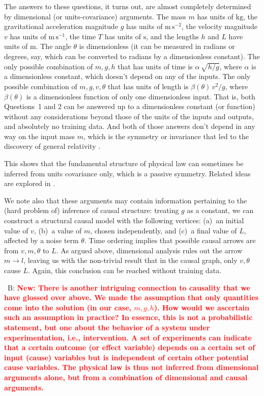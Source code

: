 \documentclass{article}
\newcommand{\unit}[1]{\mathrm{#1}}
\newcommand{\kg}{\unit{kg}}
\newcommand{\m}{\unit{m}}
\newcommand{\s}{\unit{s}}
\newcommand{\bernhard}[1]{~B: \textcolor{red}{\textbf{#1}}}
\begin{document}
The answers to these questions, it turns out, are almost completely determined by dimensional (or units-covariance) arguments.
The mass $m$ has units of $\kg$, the gravitational acceleration magnitude $g$ has units of $\m\,\s^{-2}$, the velocity magnitude $v$ has units of $\m\,\s^{-1}$, the time $T$ has units of $\s$, and the lengths $h$ and $L$ have units of $\m$.
The angle $\theta$ is dimensionless (it can be measured in radians or degrees, say, which can be converted to radians by a dimensionless constant).
The only possible combination of $m, g, h$ that has units of time is $\alpha\,\sqrt{h/g}$, where $\alpha$ is a dimensionless constant, which doesn't depend on any of the inputs.
The only possible combination of $m, g, v, \theta$ that has units of length is $\beta(\theta)\,v^2/g$, where $\beta(\theta)$ is a dimensionless function of only one dimensionless input.
That is, both Questions~1 and 2 can be answered up to a dimensionless constant (or function) without any considerations beyond those of the units of the inputs and outputs, and absolutely no training data.
And both of those answers don't depend in any way on the input mass $m$, which is the symmetry or invariance that led to the discovery of general relativity \cite{gr}.

This shows that the fundamental structure of physical law can sometimes be inferred from units covariance only, which is a passive symmetry.  Related ideas are explored in \cite{villar2022dimensionless}.

We note also that these arguments may contain information pertaining to the (hard problem of) inference of causal structure:
treating $g$ as a constant, we can construct a structural causal model with the following vertices: (a)~an initial value of $v$, (b)~a value of $m$, chosen independently, and (c)~a final value of $L$, affected by a noise term $\theta$.
Time ordering implies that possible causal arrows are from $v, m, \theta$ to $L$.
As argued above, dimensional analysis rules out the arrow $m\to l$, leaving us with the non-trivial result that in the causal graph, only $v,\theta$ cause $L$.
Again, this conclusion can be reached without training data.

\bernhard{New: There is another intriguing connection to causality that we have glossed over above.
We made the assumption that only quantities come into the solution (in our case, $m, g, h$). How would we ascertain such an assumption in practice? In essence, this is not a probabilistic statement, but one about the behavior of a system under experimentation, i.e., intervention. A set of experiments can indicate that a certain outcome (or effect variable) depends on a certain set of input (cause) variables but is independent of certain other potential cause variables. The physical law is thus not inferred from dimensional arguments alone, but from a combination of dimensional and causal arguments.}
\end{document}
